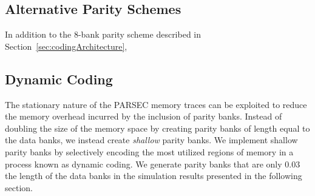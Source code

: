 \subsection{Alternative Parity Schemes}
In addition to the 8-bank parity scheme described in Section~\ref{sec:codingArchitecture},

\subsection{Dynamic Coding}
The stationary nature of the PARSEC memory traces can be exploited to reduce the memory overhead incurred by the inclusion of parity banks. Instead of doubling the size of the memory space by creating parity banks of length equal to the data banks, we  instead create \textit{shallow} parity banks. We implement shallow parity banks by selectively encoding the most utilized regions of memory in a process known as dynamic coding.  We generate parity banks that are only $0.03$ the length of the data banks in the simulation results presented in the following section.

%
%
%

